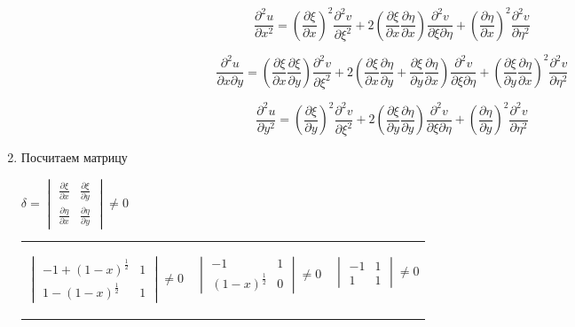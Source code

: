 \documentclass[a4paper, 12pt]{extarticle}
\newcommand{\D}[2]{\frac{\partial #1}{\partial #2}}
\newcommand{\DQ}[2]{\frac{\partial^2 #1}{\partial #2^2}}
\newcommand{\DM}[3]{\frac{\partial^2 #1}{\partial #2 \partial #3}}
\begin{document}
\begin{enumerate}[leftmargin=*]
    \begin{tcolorbox}[width=11cm,height=1.5cm, top=-0.4cm]
        $$\DQ{u}{x}=\left(\D{\xi}{x}\right)^2\DQ{v}{\xi}+2\left(\D{\xi}{x}\D{\eta}{x}\right)\DM{v}{\xi}{\eta}+\left(\D{\eta}{x}\right)^2\DQ{v}{\eta}$$
    \end{tcolorbox}
    \begin{tcolorbox}[width=13cm,height=1.5cm, top=-0.4cm]
        $$\DM{u}{x}{y}=\left(\D{\xi}{x}\D{\xi}{y}\right)\DQ{v}{\xi}+2\left(\D{\xi}{x}\D{\eta}{y}+\D{\xi}{y}\D{\eta}{x}\right)\DM{v}{\xi}{\eta}+\left(\D{\xi}{y}\D{\eta}{x}\right)^2\DQ{v}{\eta}$$
    \end{tcolorbox}
    \begin{tcolorbox}[width=11cm,height=1.5cm, top=-0.4cm]
        $$\DQ{u}{y}=\left(\D{\xi}{y}\right)^2\DQ{v}{\xi}+
        2\left(\D{\xi}{y}\D{\eta}{y}\right)\DM{v}{\xi}{\eta}+\left(\D{\eta}{y}\right)^2\DQ{v}{\eta}$$
    \end{tcolorbox}
    \item Посчитаем матрицу 

        $\delta=\begin{vmatrix}
            \D{\xi}{x}&\D{\xi}{y}\\
            \D{\eta}{x}&\D{\eta}{y}
        \end{vmatrix}\neq 0 $

    \begin{tabularx}{\textwidth} { 
        >{\centering}l 
        >{\centering}l 
        >{\centering}l}
        \begin{tcolorbox}[width=5.3cm]
            $\begin{vmatrix}
                -1+(1-x)^{\frac{1}{2}}&1\\
                1-(1-x)^{\frac{1}{2}}&1
            \end{vmatrix}\neq 0$   
        \end{tcolorbox}
        &
        \begin{tcolorbox}[width=4.4cm]
            $\begin{vmatrix}
                -1 & 1 \\
                (1-x)^{\frac{1}{2}}& 0
            \end{vmatrix}\neq 0$
        \end{tcolorbox}
        &
        \begin{tcolorbox}[width=3.3cm]
            $\begin{vmatrix}
                -1 & 1\\
                1 &  1
            \end{vmatrix}\neq 0$
        \end{tcolorbox}
        
    \end{tabularx}

    \end{enumerate}
    
\end{document}
